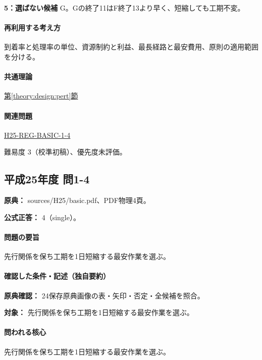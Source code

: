 \noindent\textbf{5：選ばない候補} G。Gの終了11はF終了13より早く、短縮しても工期不変。\par

\paragraph{再利用する考え方} 到着率と処理率の単位、資源制約と利益、最長経路と最安費用、原則の適用範囲を分ける。

\paragraph{共通理論} \hyperref[theory:design:pert]{第\ref*{theory:design:pert}節}

\paragraph{関連問題} \hyperref[q:h25-reg-basic-1-4]{H25-REG-BASIC-1-4}

\par 難易度 3（校準初稿）、優先度未評価。

\subsection{平成25年度 問1-4}
\label{q:h25-reg-basic-1-4}

\noindent\textbf{原典：} sources/H25/basic.pdf、PDF物理4頁。

\textbf{公式正答：} 4（single）。

\paragraph{問題の要旨} 先行関係を保ち工期を1日短縮する最安作業を選ぶ。

\paragraph{確認した条件・記述（独自要約）}\mbox{}\par

\noindent\textbf{原典確認：} 24保存原典画像の表・矢印・否定・全候補を照合。\par

\noindent\textbf{対象：} 先行関係を保ち工期を1日短縮する最安作業を選ぶ。\par

\paragraph{問われる核心} 先行関係を保ち工期を1日短縮する最安作業を選ぶ。

